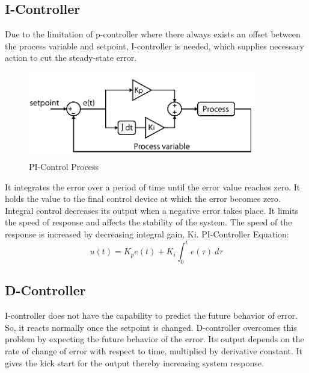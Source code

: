 \documentclass[12pt,a4paper]{book}
\begin{document}

\subsection{I-Controller}
Due to the limitation of p-controller where there always exists an offset between the process variable and setpoint, I-controller is needed, which supplies necessary action to cut the steady-state error.

\begin{figure}[h]
  \centering
  \includegraphics[width=10cm]{image9.png}
  \caption{PI-Control Process}
  \label{fig:image9}
\end{figure}

It integrates the error over a period of time until the error value reaches zero. It holds the value to the final control device at which the error becomes zero. Integral control decreases its output when a negative error takes place. It limits the speed of response and affects the stability of the system. The speed of the response is increased by decreasing integral gain, Ki. PI-Controller Equation:
\begin{equation}
  u\left(t\right)=K_pe\left(t\right)+K_i\int_{0}^{t}{e\left(\tau\right)\ d\tau}
  \label{equation:eq2}
\end{equation}

\subsection{D-Controller}
I-controller does not have the capability to predict the future behavior of error. So, it reacts normally once the setpoint is changed. D-controller overcomes this problem by expecting the future behavior of the error. Its output depends on the rate of change of error with respect to time, multiplied by derivative constant. It gives the kick start for the output thereby increasing system response.
\end{document}
